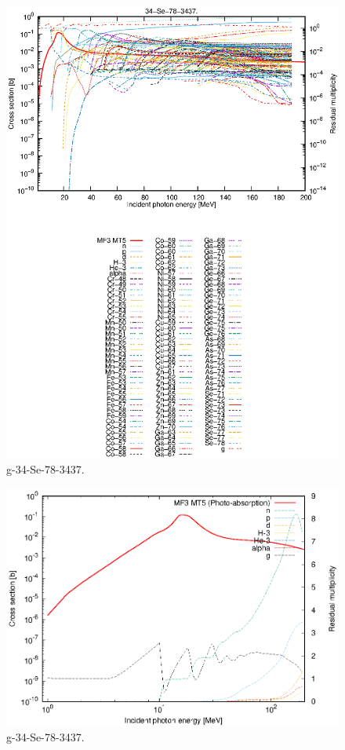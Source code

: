 \begin{figure}
 \includegraphics[width=\linewidth]{eps/g_34-Se-78_3437.eps}
  \caption{g-34-Se-78-3437.}
\end{figure}
\newpage \clearpage

\begin{figure}
 \includegraphics[width=\linewidth]{eps-log/g_34-Se-78_3437.eps}
 \caption{g-34-Se-78-3437.}
\end{figure}
\newpage \clearpage


